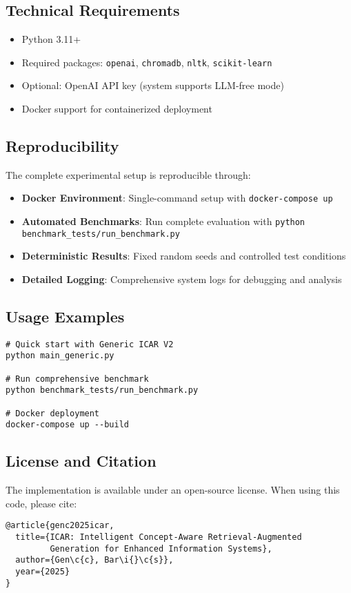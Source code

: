 \documentclass[11pt]{article}
\begin{document}
\subsection*{Technical Requirements}
\begin{itemize}
\item Python 3.11+
\item Required packages: \texttt{openai}, \texttt{chromadb}, \texttt{nltk}, \texttt{scikit-learn}
\item Optional: OpenAI API key (system supports LLM-free mode)
\item Docker support for containerized deployment
\end{itemize}

\subsection*{Reproducibility}
The complete experimental setup is reproducible through:
\begin{itemize}
\item \textbf{Docker Environment}: Single-command setup with \texttt{docker-compose up}
\item \textbf{Automated Benchmarks}: Run complete evaluation with \texttt{python benchmark\_tests/run\_benchmark.py}
\item \textbf{Deterministic Results}: Fixed random seeds and controlled test conditions
\item \textbf{Detailed Logging}: Comprehensive system logs for debugging and analysis
\end{itemize}

\subsection*{Usage Examples}
\begin{verbatim}
# Quick start with Generic ICAR V2
python main_generic.py

# Run comprehensive benchmark
python benchmark_tests/run_benchmark.py

# Docker deployment
docker-compose up --build
\end{verbatim}

\subsection*{License and Citation}
The implementation is available under an open-source license. When using this code, please cite:
\begin{verbatim}
@article{genc2025icar,
  title={ICAR: Intelligent Concept-Aware Retrieval-Augmented 
         Generation for Enhanced Information Systems},
  author={Gen\c{c}, Bar\i{}\c{s}},
  year={2025}
}
\end{verbatim}
\end{document}
